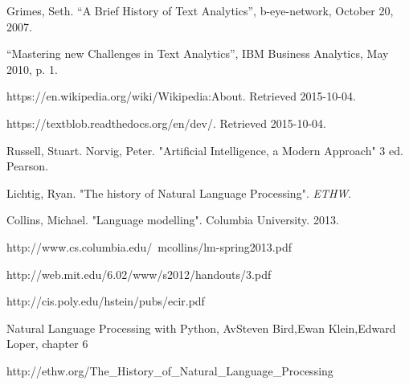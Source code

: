\documentclass[a4paper]{article}
\begin{document}
\begin{thebibliography}{9}

Grimes, Seth. “A Brief History of Text Analytics”, b-eye-network, October 20, 2007.

“Mastering new Challenges in Text Analytics”, IBM Business Analytics, May 2010, p. 1.

https://en.wikipedia.org/wiki/Wikipedia:About. Retrieved 2015-10-04.

https://textblob.readthedocs.org/en/dev/. Retrieved 2015-10-04.

Russell, Stuart. Norvig, Peter. "Artificial Intelligence, a Modern Approach" 3 ed. Pearson. 

Lichtig, Ryan. "The history of Natural Language Processing". \textit{ETHW}. 

Collins, Michael. "Language modelling". Columbia University. 2013.

http://www.cs.columbia.edu/~mcollins/lm-spring2013.pdf

http://web.mit.edu/6.02/www/s2012/handouts/3.pdf

http://cis.poly.edu/hstein/pubs/ecir.pdf

Natural Language Processing with Python, AvSteven Bird,Ewan Klein,Edward Loper, chapter 6

http://ethw.org/The\_History\_of\_Natural\_Language\_Processing

\end{thebibliography}






\end{document}
